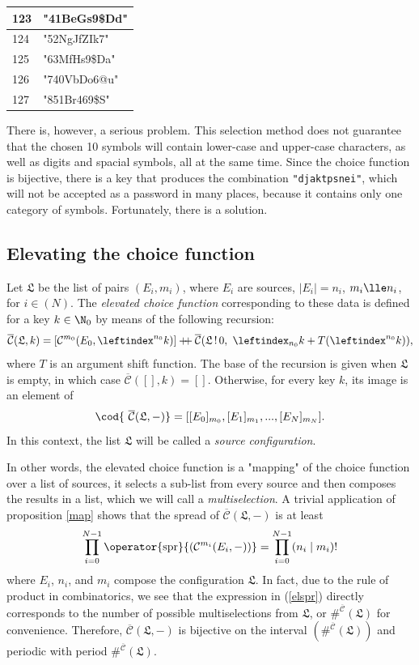 \documentclass[12pt, a4paper]{article}
\renewcommand{\C}{\mathcal{C}}
\newcommand{\CC}{\overline{\mathcal{C}}}
\newcommand{\conf}{\mathfrak{L}}
\newcommand{\dop}{\mathbin{{+}\hspace{-1mm}{+}}}
\newcommand{\spr}[1]{\operator{\mathrm{spr}}{\left(#1\right)}}
\newcommand{\lli}[1]{\leftindex_{#1}}
\newcommand{\lui}[1]{\leftindex^{#1}}
\newcommand{\wo}{\mathop{!}}
\begin{document}
\begin{center}
\def\arraystretch{1.3}
\begin{tabular}{l|l}
    123 & \ttfamily"41BeGs9\$Dd"\\
    \hline
    124 & \ttfamily"52NgJfZIk7"\\
    \hline
    125 & \ttfamily"63MfHs9\$Da"\\
    \hline
    126 & \ttfamily"740VbDo6@u"\\
    \hline
    127 & \ttfamily"851Br469\$S"\\
\end{tabular}
\end{center}

There is, however, a serious problem. This selection method does not guarantee that the chosen 10 symbols will contain lower-case and upper-case characters, as well as digits and spacial symbols, all at the same time. Since the choice function is bijective, there is a key that produces the combination \texttt{"djaktpsnei"}, which will not be accepted as a password in many places, because it contains only one category of symbols. Fortunately, there is a solution.

\subsection{Elevating the choice function}

\begin{definition}
    Let $ \conf $ be the list of pairs $ (E_i, m_i) $, where $ E_i $ are sources, $ |E_i| = n_i $, $ m_i \lle n_i $, for $ i \in (N) $. The \emph{elevated choice function} corresponding to these data is defined for a key $ k \in \N_0 $ by means of the following recursion:
    \[ \CC(\conf, k) = [\C^{m_0}(E_0, \lui{n_0}k)] \dop \CC(\conf \wo 0,\ \lli{n_0}k + T(\lui{n_0}k)), \]
    where $ T $ is an argument shift function. The base of the recursion is given when $ \conf $ is empty, in which case $ \CC([], k) = [] $. Otherwise, for every key $ k $, its image is an element of
    \[ \cod{\ \CC(\conf, -)} = [[E_0]_{m_0}, [E_1]_{m_1}, ..., [E_N]_{m_N}]. \]
    In this context, the list $ \conf $ will be called a \emph{source configuration}.
\end{definition}

In other words, the elevated choice function is a "mapping" of the choice function over a list of sources, it selects a sub-list from every source and then composes the results in a list, which we will call a \emph{multiselection}. A trivial application of proposition \ref{map} shows that the spread of $ \CC(\conf, -) $ is at least
\begin{equation}\label{elspr}
    \prod\limits_{i = 0}^{N-1} \spr{\C^{m_i}(E_i, -)} = \prod\limits_{i = 0}^{N-1} (n_i \mid m_i)!
\end{equation}
where $ E_i $, $ n_i $, and $ m_i $ compose the configuration $ \conf $. In fact, due to the rule of product in combinatorics, we see that the expression in (\ref{elspr}) directly corresponds to the number of possible multiselections from $ \conf $, or $ \#^{\CC}(\conf) $ for convenience. Therefore, $ \CC(\conf, -) $ is bijective on the interval $ \left(\#^{\CC}(\conf)\right) $ and periodic with period $ \#^{\CC}(\conf) $.
\end{document}
